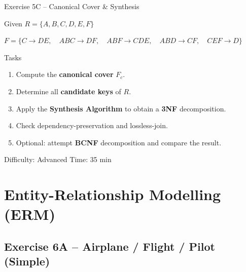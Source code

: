 \documentclass[10pt]{beamer}
\begin{document}
\begin{frame}{Exercise 5C -- Canonical Cover \& Synthesis}
  \begin{block}{Given}
    $R = \{A, B, C, D, E, F\}$

    \vspace{4pt}
    $F = \{C \to DE,\quad ABC \to DF,\quad ABF \to CDE,\quad ABD \to CF,\quad CEF \to D\}$
  \end{block}

  \begin{block}{Tasks}
    \begin{enumerate}
      \item Compute the \textbf{canonical cover} $F_c$.
      \item Determine all \textbf{candidate keys} of $R$.
      \item Apply the \textbf{Synthesis Algorithm} to obtain a \textbf{3NF} decomposition.
      \item Check dependency-preservation and lossless-join.
      \item Optional: attempt \textbf{BCNF} decomposition and compare the result.
    \end{enumerate}
  \end{block}

  \begin{alertblock}{Difficulty: Advanced \quad Time: 35 min}
  \end{alertblock}
\end{frame}

\section{Entity-Relationship Modelling (ERM)}

\subsection{Exercise 6A -- Airplane / Flight / Pilot (Simple)}
\end{document}
